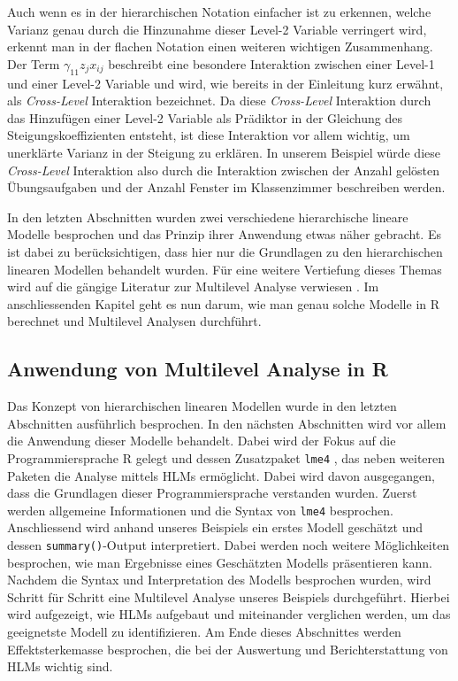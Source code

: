\documentclass[12pt]{article}\usepackage[]{graphicx}\usepackage[]{color}
\begin{document}
Auch wenn es in der hierarchischen Notation einfacher ist zu erkennen, welche Varianz genau durch die Hinzunahme dieser Level-2 Variable verringert wird, erkennt man in der flachen Notation einen weiteren wichtigen Zusammenhang. Der Term $\gamma_{11}z_{j}x_{ij}$ beschreibt eine besondere Interaktion zwischen einer Level-1 und einer Level-2 Variable und wird, wie bereits in der Einleitung kurz erwähnt, als \textit{Cross-Level} Interaktion bezeichnet. Da diese \textit{Cross-Level} Interaktion durch das Hinzufügen einer Level-2 Variable als Prädiktor in der Gleichung des Steigungskoeffizienten entsteht, ist diese Interaktion vor allem wichtig, um unerklärte Varianz in der Steigung zu erklären. In unserem Beispiel würde diese \textit{Cross-Level} Interaktion also durch die Interaktion zwischen der Anzahl gelösten Übungsaufgaben und der Anzahl Fenster im Klassenzimmer beschreiben werden.

In den letzten Abschnitten wurden zwei verschiedene hierarchische lineare Modelle besprochen und das Prinzip ihrer Anwendung etwas näher gebracht. Es ist dabei zu berücksichtigen, dass hier nur die Grundlagen zu den hierarchischen linearen Modellen behandelt wurden. Für eine weitere Vertiefung dieses Themas wird auf die gängige Literatur zur Multilevel Analyse verwiesen \citep{andrew_data, SnijdersTomA.B2012Ma:a, twisk_2006}. Im anschliessenden Kapitel geht es nun darum, wie man genau solche Modelle in R berechnet und Multilevel Analysen durchführt.

\subsection{Anwendung von Multilevel Analyse in R} \label{section:ml_in_R}
Das Konzept von hierarchischen linearen Modellen wurde in den letzten Abschnitten ausführlich besprochen. In den nächsten Abschnitten wird vor allem die Anwendung dieser Modelle behandelt. Dabei wird der Fokus auf die Programmiersprache R gelegt und dessen Zusatzpaket \texttt{lme4} \citep{batesetal2015lme4}, das neben weiteren Paketen die Analyse mittels HLMs ermöglicht. Dabei wird davon ausgegangen, dass die Grundlagen dieser Programmiersprache verstanden wurden. Zuerst werden allgemeine Informationen und die Syntax von \texttt{lme4} besprochen. Anschliessend wird anhand unseres Beispiels ein erstes Modell geschätzt und dessen \texttt{summary()}-Output interpretiert. Dabei werden noch weitere Möglichkeiten besprochen, wie man Ergebnisse eines Geschätzten Modells präsentieren kann. Nachdem die Syntax und Interpretation des Modells besprochen wurden, wird Schritt für Schritt eine Multilevel Analyse unseres Beispiels durchgeführt. Hierbei wird aufgezeigt, wie HLMs aufgebaut und miteinander verglichen werden, um das geeignetste Modell zu identifizieren. Am Ende dieses Abschnittes werden Effektsterkemasse besprochen, die bei der Auswertung und Berichterstattung von HLMs wichtig sind.  
\end{document}
